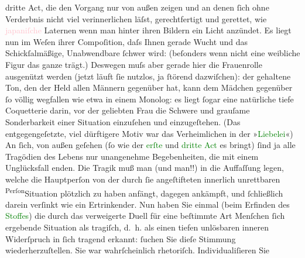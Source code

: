                     dritte Act, die den Vorgang nur von außen zeigen und an denen ſich ohne
                    Verderbnis nicht viel verinnerlichen läſst, gerechtfertigt und gerettet, wie
                        \textcolor{pink}{japaniſche}{}\ledrightnote{\textcolor{pink}{Japan}} Laternen wenn man hinter ihren Bildern ein Licht anzündet. Es liegt
                        {\pb}nun im Weſen ihrer
                    Compoſition, daſs Ihnen gerade Wucht und das Schickſalmäßige, Unabwendbare
                    ſchwer wird: (beſonders wenn nicht eine weibliche Figur das ganze trägt.)
                    Deswegen muſs aber gerade hier die Frauenrolle ausgenützt werden (jetzt läuft
                    ſie nutzlos, ja ſtörend dazwiſchen): der gehaltene Ton, den der Held allen
                    Männern gegenüber hat, kann dem Mädchen gegenüber ſo völlig wegfallen wie etwa
                    in einem Monolog: es liegt ſogar eine natürliche tiefe Coquetterie darin, {\pb}vor der geliebten Frau die
                    Schwere und grauſame Sonderbarkeit einer Situation einzuſehen und einzugeſtehen.
                    (Das entgegengeſetzte, viel dürftigere Motiv war das Verheimlichen in der
                        »\textcolor{green}{Liebelei}{}\ledrightnote{\textcolor{green}{Liebelei. Schauspiel in drei Akten}}«)\pend
           \pstart
           An ſich, von außen geſehen (ſo wie der \textcolor{green}{erſte}{}
                    und \textcolor{green}{dritte Act}{} es bringt) ſind ja alle
                    Tragödien des Lebens nur unangenehme Begebenheiten, die mit einem Unglücksfall
                    enden. Die Tragik muß man (und  man!!) in
                    die Auffaſſung legen, welche die Hauptperſon von der durch ſie angeſtifteten {\pb}innerlich unrettbaren \substVorne{}\textsuperscript{Perſon}{\allowbreak}\substDazwischen{}Situation\substHinten{} plötzlich zu haben anfängt, dagegen ankämpft, und ſchließlich darein
                    verſinkt wie ein Ertrinkender. Nun haben Sie einmal (beim Erfinden des \textcolor{green}{Stoffes}{}) die durch das verweigerte Duell für
                    eine beſtimmte Art Menſchen ſich ergebende Situation als tragiſch, d. h. als
                    einen tiefen unlösbaren inneren Widerſpruch in ſich tragend erkannt: {\pb}ſuchen Sie dieſe Stimmung
                    wiederherzuſtellen. Sie war wahrſcheinlich rhetoriſch. Individualiſieren Sie
